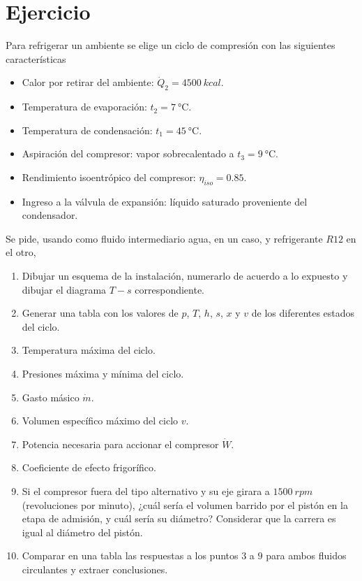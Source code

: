 \section{Ejercicio}\label{ej:Chap11Ejercicio16}
Para refrigerar un ambiente se elige un ciclo de compresión con las siguientes características
\begin{itemize}
    \item Calor por retirar del ambiente: $\dot{Q}_2=\SI{4500}{kcal}$.
    \item Temperatura de evaporación: $t_2=\SI{7}{\celsius}$.
    \item Temperatura de condensación: $t_1=\SI{45}{\celsius}$.
    \item Aspiración del compresor: vapor sobrecalentado a $t_3=\SI{9}{\celsius}$.
    \item Rendimiento isoentrópico del compresor: $\eta_{iso}=0.85$.
    \item Ingreso a la válvula de expansión: líquido saturado proveniente del condensador.
\end{itemize}

Se pide, usando como fluido intermediario agua, en un caso, y refrigerante $R12$ en el otro,
\begin{enumerate}
    \item Dibujar un esquema de la instalación, numerarlo de acuerdo a lo expuesto y dibujar el diagrama $T-s$ correspondiente.
    \item Generar una tabla con los valores de $p$, $T$, $h$, $s$, $x$ y $v$ de los diferentes estados del ciclo.
    \item Temperatura máxima del ciclo.
    \item Presiones máxima y mínima del ciclo.
    \item Gasto másico $\dot{m}$.
    \item Volumen específico máximo del ciclo $v$.
    \item Potencia necesaria para accionar el compresor $\dot{W}$.
    \item Coeficiente de efecto frigorífico.
    \item Si el compresor fuera del tipo alternativo y su eje girara a $\SI{1500}{rpm}$ (revoluciones por minuto), ¿cuál sería el volumen barrido por el pistón en la etapa de admisión, y cuál sería su diámetro? Considerar que la carrera es igual al diámetro del pistón.
    \item Comparar en una tabla las respuestas a los puntos $3$ a $9$ para ambos fluidos circulantes y extraer conclusiones.
\end{enumerate}